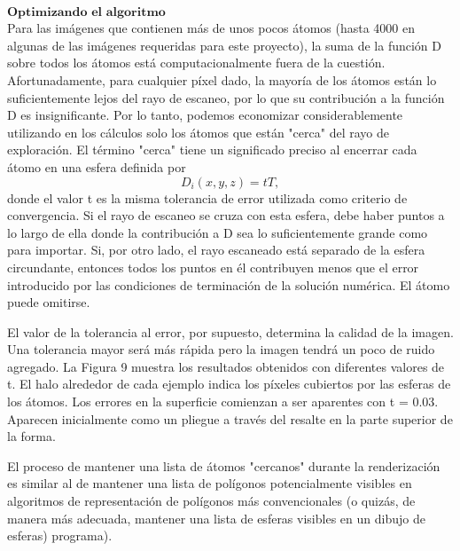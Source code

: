 ${ }$\\
$\textbf{Optimizando el algoritmo}$
${ }$\\

Para las imágenes que contienen más de unos pocos átomos (hasta 4000 en algunas de las imágenes requeridas para este proyecto), la suma de la función D sobre todos los átomos está computacionalmente fuera de la cuestión. Afortunadamente, para cualquier píxel dado, la mayoría de los átomos están lo suficientemente lejos del rayo de escaneo, por lo que su contribución a la función D es insignificante. Por lo tanto, podemos economizar considerablemente utilizando en los cálculos solo los átomos que están "cerca" del rayo de exploración. El término "cerca" tiene un significado preciso al encerrar cada átomo en una esfera definida por
\[
	D_i (x,y,z) = tT,
\]
donde el valor t es la misma tolerancia de error utilizada como criterio de convergencia. Si el rayo de escaneo se cruza con esta esfera, debe haber puntos a lo largo de ella donde la contribución a D sea lo suficientemente grande como para importar. Si, por otro lado, el rayo escaneado está separado de la esfera circundante, entonces todos los puntos en él contribuyen menos que el error introducido por las condiciones de terminación de la solución numérica. El átomo puede omitirse.

El valor de la tolerancia al error, por supuesto, determina la calidad de la imagen. Una tolerancia mayor será más rápida pero la imagen tendrá un poco de ruido agregado. La Figura 9 muestra los resultados obtenidos con diferentes valores de t. El halo alrededor de cada ejemplo indica los píxeles cubiertos por las esferas de los átomos. Los errores en la superficie comienzan a ser aparentes con t = 0.03. Aparecen inicialmente como un pliegue a través del resalte en la parte superior de la forma.

El proceso de mantener una lista de átomos "cercanos" durante la renderización es similar al de mantener una lista de polígonos potencialmente visibles en algoritmos de representación de polígonos más convencionales (o quizás, de manera más adecuada, mantener una lista de esferas visibles en un dibujo de esferas) programa).

